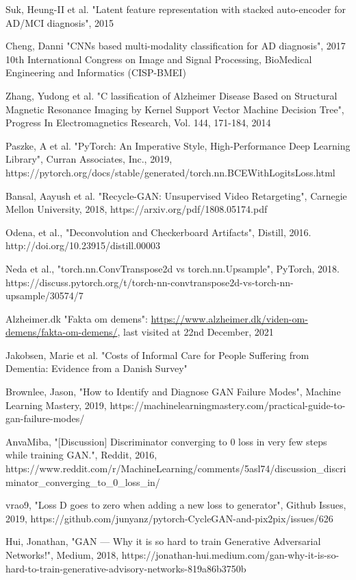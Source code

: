 \documentclass[12pt, fleqn, titlepage]{article}
\begin{document}
\begin{thebibliography}{9}
		  Suk, Heung-II et al. "Latent feature representation with stacked auto-encoder for AD/MCI diagnosis", 2015
		
		 Cheng, Danni "CNNs based multi-modality classification for AD diagnosis", 2017 10th International Congress on Image and Signal Processing, BioMedical Engineering and Informatics (CISP-BMEI) 
		
		 Zhang, Yudong et al. "C	lassification of Alzheimer Disease Based on Structural Magnetic
		Resonance Imaging by Kernel Support Vector Machine Decision Tree", Progress In Electromagnetics Research, Vol. 144, 171-184, 2014
		
		 Paszke, A et al. "PyTorch: An Imperative Style, High-Performance Deep Learning Library", Curran Associates, Inc., 2019, https://pytorch.org/docs/stable/generated/torch.nn.BCEWithLogitsLoss.html
		
		 Bansal, Aayush et al. "Recycle-GAN: Unsupervised Video Retargeting", Carnegie Mellon University, 2018, https://arxiv.org/pdf/1808.05174.pdf
		
		 Odena, et al., "Deconvolution and Checkerboard Artifacts", Distill, 2016. http://doi.org/10.23915/distill.00003
		
		 Neda et al., "torch.nn.ConvTranspose2d vs torch.nn.Upsample", PyTorch, 2018. https://discuss.pytorch.org/t/torch-nn-convtranspose2d-vs-torch-nn-upsample/30574/7
		
		 Alzheimer.dk "Fakta om demens": \url{https://www.alzheimer.dk/viden-om-demens/fakta-om-demens/}, last visited at 22nd December, 2021
		
		 Jakobsen, Marie et al. "Costs of Informal Care for People Suffering from Dementia: Evidence from a Danish Survey"
		
		 Brownlee, Jason, "How to Identify and Diagnose GAN Failure Modes", Machine Learning Mastery, 2019, https://machinelearningmastery.com/practical-guide-to-gan-failure-modes/
		
		 AnvaMiba, "[Discussion] Discriminator converging to 0 loss in very few steps while training GAN.", Reddit, 2016, https://www.reddit.com/r/MachineLearning/comments/5asl74/discussion\_discriminator\_converging\_to\_0\_loss\_in/
		
		 vrao9, "Loss D goes to zero when adding a new loss to generator", Github Issues, 2019, https://github.com/junyanz/pytorch-CycleGAN-and-pix2pix/issues/626
		
		 Hui, Jonathan, "GAN — Why it is so hard to train Generative Adversarial Networks!", Medium, 2018, https://jonathan-hui.medium.com/gan-why-it-is-so-hard-to-train-generative-advisory-networks-819a86b3750b
		
	\end{thebibliography}
	
\end{document}
